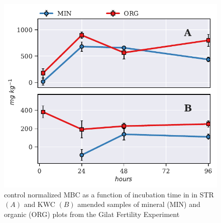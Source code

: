 			\begin{figure}[H]
				\centering
				\includegraphics[width=\linewidth]{thesis_figures/preliminary/control_normalized/MBC.pdf}
				\caption{control normalized MBC  as a function of incubation time in in STR $\left(A\right)$ and KWC $\left(B\right)$ amended samples of mineral (MIN) and organic (ORG) plots from the Gilat Fertility Experiment}
				\label{fig:nor_mbc_treated_preliminary}
			\end{figure}



